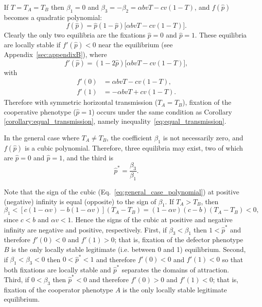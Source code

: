\documentclass[12pt]{extarticle}
\begin{document}
{If $T=T_A=T_B$ then $\beta_1=0$ and $\beta_3=-\beta_2=\alpha b vT -cv(1-T)$, 
and $f(\hat{p})$ becomes a quadratic polynomial:
\begin{equation} \label{eq:equal_horizontal_transmission}
  f(\hat{p}) = \hat{p}(1-\hat{p})\big[\alpha bvT - cv(1-T)\big].
\end{equation}
Clearly the only two equilibria are the fixations  $\hat{p} =  0$ and $\hat{p} = 1$.
These equilibria are locally stable if $f'(\hat{p})<0$ near the equilibrium (see Appendix~\autoref{sec:appendixB}), where
\begin{equation}
f'(\hat{p})=(1-2\hat{p})\big[\alpha bvT - cv(1-T)\big],
\end{equation}
with
\begin{equation} \label{eq:derivative_of_phattag-phat}
\begin{aligned}
	f'(0) &=	\alpha bvT - cv(1-T), \\
	f'(1) &=	-\alpha bvT + cv(1-T).
\end{aligned}
\end{equation}
Therefore with symmetric horizontal transmission ($T_A=T_B$), fixation of the cooperative phenotype ($\hat{p}=1$) occurs under the same condition as Corollary \ref{corollary:equal_transmission}, namely inequality~\ref{eq:equal_transmission}.


In the general case where $T_A \neq T_B$, the coefficient $\beta_1$ is not necessarily zero, and $f(\hat{p})$ is a cubic polynomial.
Therefore, three equilibria may exist, two of which are
$\hat{p} = 0 $ and $\hat{p} = 1$, and the third is
\begin{equation} \label{eq:oblique_and_vertic_result}
  \hat{p}^* =  
  \frac{\beta_3}{\beta_1}.
\end{equation}

Note that the sign of the  cubic (Eq.\ \ref{eq:general_case_polynomial}) at positive (negative) infinity is equal (opposite) to the sign of $\beta_1$. 
If $T_A>T_B$, then 
\begin{equation} \label{eq:beta1}
   \beta_1 < [c(1-\alpha v) - b(1-\alpha v)] (T_A-T_B) 
   = (1-\alpha v)(c-b)(T_A-T_B) < 0 ,
 \end{equation}
since $c<b$ and $\alpha v < 1$. Hence the signs of the cubic at positive and negative infinity are negative and positive, respectively.
First, if $\beta_3<\beta_1$ then 
$1<\hat{p}^*$ and therefore $f'(0)<0$ and $f'(1)>0$; that is, fixation of the defector phenotype $B$ is the only locally stable legitimate (i.e. between 0 and 1) equilibrium.
Second, if $\beta_1<\beta_3<0$ then 
$0<\hat{p}^*<1$ and therefore $f'(0)<0$ and $f'(1)<0$ so that both fixations are locally stable and $\hat{p}^*$ separates the domains of attraction.
Third, if $0<\beta_3$ then 
$\hat{p}^*<0$ and therefore $f'(0)>0$ and $f'(1)<0$; that is, fixation of the cooperator phenotype $A$ is the only locally stable legitimate equilibrium.

}
\end{document}
